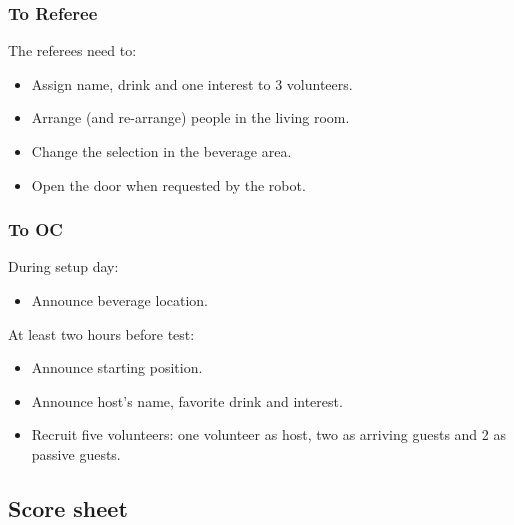 \subsubsection*{To Referee}

The referees need to:
\begin{itemize}
	\item Assign name, drink and one interest to 3 volunteers.
	\item Arrange (and re-arrange) people in the living room.
	\item Change the selection in the beverage area.
	\item Open the door when requested by the robot.
\end{itemize}

\subsubsection*{To OC}


During setup day:
\begin{itemize}
	\item Announce beverage location.
\end{itemize}


At least two hours before test:
\begin{itemize}
	\item Announce starting position.
	\item Announce host's name, favorite drink and interest.
	\item Recruit five volunteers: one volunteer as host, two as arriving guests and 2 as passive guests.

\end{itemize}

\subsection*{Score sheet}
